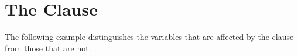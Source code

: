 \pagebreak
\chapter{The  Clause}
\label{chap:default_none}

The following example distinguishes the variables that are affected by the  
clause from those that are not. 




